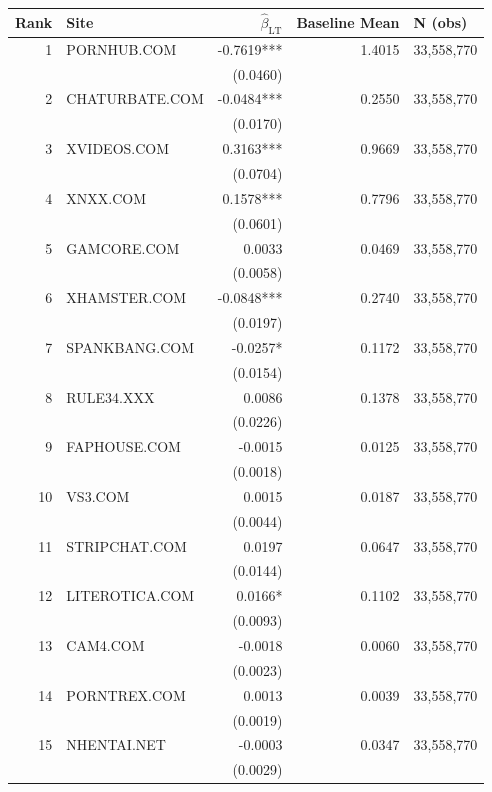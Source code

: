 \begin{tabular}{rlrrl}
\toprule
  Rank & Site & $\hat{\beta}_{\mathrm{LT}}$ & Baseline Mean & N (obs) \\
\midrule
  1 & PORNHUB.COM & -0.7619*** & 1.4015 & 33,558,770 \\
    &   & (0.0460) &   &   \\
  2 & CHATURBATE.COM & -0.0484*** & 0.2550 & 33,558,770 \\
    &   & (0.0170) &   &   \\
  3 & XVIDEOS.COM & 0.3163*** & 0.9669 & 33,558,770 \\
    &   & (0.0704) &   &   \\
  4 & XNXX.COM & 0.1578*** & 0.7796 & 33,558,770 \\
    &   & (0.0601) &   &   \\
  5 & GAMCORE.COM & 0.0033 & 0.0469 & 33,558,770 \\
    &   & (0.0058) &   &   \\
  6 & XHAMSTER.COM & -0.0848*** & 0.2740 & 33,558,770 \\
    &   & (0.0197) &   &   \\
  7 & SPANKBANG.COM & -0.0257* & 0.1172 & 33,558,770 \\
    &   & (0.0154) &   &   \\
  8 & RULE34.XXX & 0.0086 & 0.1378 & 33,558,770 \\
    &   & (0.0226) &   &   \\
  9 & FAPHOUSE.COM & -0.0015 & 0.0125 & 33,558,770 \\
    &   & (0.0018) &   &   \\
  10 & VS3.COM & 0.0015 & 0.0187 & 33,558,770 \\
    &   & (0.0044) &   &   \\
  11 & STRIPCHAT.COM & 0.0197 & 0.0647 & 33,558,770 \\
    &   & (0.0144) &   &   \\
  12 & LITEROTICA.COM & 0.0166* & 0.1102 & 33,558,770 \\
    &   & (0.0093) &   &   \\
  13 & CAM4.COM & -0.0018 & 0.0060 & 33,558,770 \\
    &   & (0.0023) &   &   \\
  14 & PORNTREX.COM & 0.0013 & 0.0039 & 33,558,770 \\
    &   & (0.0019) &   &   \\
  15 & NHENTAI.NET & -0.0003 & 0.0347 & 33,558,770 \\
    &   & (0.0029) &   &   \\

\end{tabular}
